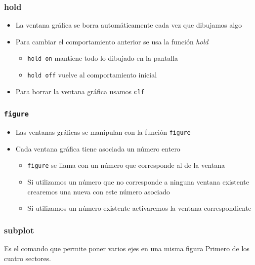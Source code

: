 \documentclass[12pt]{beamer}
\begin{document}
\begin{frame}
\frametitle{hold}
\begin{itemize}
\item La ventana gráfica se borra automáticamente cada vez que
  dibujamos algo
\item Para cambiar el comportamiento anterior se usa la función
  \emph{hold}
  \begin{itemize}
    \item \texttt{hold on} mantiene todo lo dibujado en la pantalla
    \item \texttt{hold off} vuelve al comportamiento inicial
  \end{itemize}
  \item Para borrar la ventana gráfica usamos \texttt{clf}
\end{itemize}
\end{frame}

\begin{frame}
\frametitle{\texttt{figure}}
\begin{itemize}
\item Las ventanas gráficas se manipulan con la función
  \texttt{figure}
\item Cada ventana gráfica tiene asociada un número entero
  \begin{itemize}
    \item \texttt{figure} se llama con un número que corresponde al de
      la ventana
    \item Si utilizamos un número que no corresponde a ninguna ventana
      existente crearemos una nueva con este número asociado
    \item Si utilizamos un número existente activaremos la ventana
      correspondiente
  \end{itemize}
\end{itemize}
\end{frame}

\begin{frame}
  \frametitle{subplot}
  Es el comando que permite poner varios ejes en una misma figura
\testcode
Primero de los cuatro sectores.
\end{frame}
\end{document}
